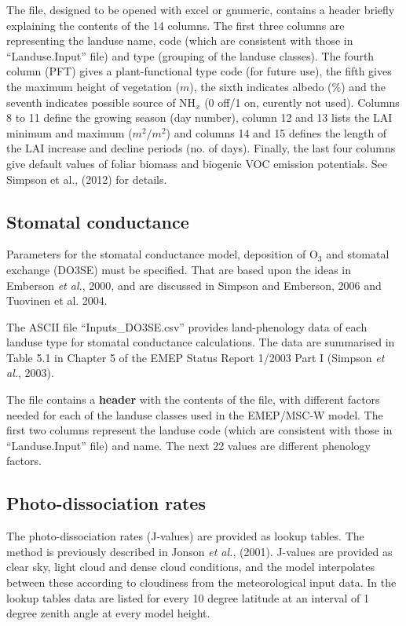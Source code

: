 \documentclass[a4paper,12pt]{report}
\newcommand{\NEW}[1]{{\color{blue}{#1}}}
\begin{document}
The file, designed to be opened with excel or gnumeric,
contains a header briefly explaining the contents of the 
14 columns. 
The first three columns are representing the landuse name, code (which
are consistent with those in ``Landuse.Input'' file) and
type (grouping of the landuse classes). The fourth column 
(PFT) gives a plant-functional type code (for future use),
 the fifth gives
the maximum height of vegetation ($m$), the sixth indicates albedo (\%) and
the seventh indicates possible source of NH$_{x}$ (0 off/1 on,
curently not used). Columns 8 to 11
define the growing season (day number), column 12 and 13 lists the
LAI minimum  and maximum ($m^{2}/m^{2}$) and 
columns 14 and 15
defines the length of the LAI increase and decline periods (no. of days).
Finally, the last four columns give default values of 
foliar biomass and biogenic VOC emission potentials. See Simpson
et al., (2012) for details.


\subsection{Stomatal conductance}
Parameters for the stomatal conductance model, deposition of O$_{3}$ and
stomatal exchange (DO3SE) must be specified. That are based upon the ideas in
Emberson {\sl et al.}, 2000, and are discussed in Simpson and Emberson,
2006 and Tuovinen et al. 2004.

The  ASCII file ``Inputs\_DO3SE.csv'' provides land-phenology data
of each landuse type for stomatal conductance calculations. The 
data are summarised in Table 5.1 in Chapter 5 of the EMEP 
Status Report 1/2003 Part I (Simpson {\sl et al.}, 2003).

The file contains a {\bf header} with the contents of the file,
with different factors needed for each of the landuse classes used
in the EMEP/MSC-W model. The first two columns represent the
landuse code (which are consistent with those in ``Landuse.Input'' file)
and name. The next 22 values are different phenology factors.


\subsection{Photo-dissociation rates}
The photo-dissociation rates (J-values) are provided as lookup
tables. The method is previously described in Jonson {\sl et
al.}, (2001). J-values are provided as clear sky, light cloud and dense
cloud conditions, and the model interpolates between these according
to cloudiness from the meteorological input data. In the lookup tables
data are listed for every 10 degree latitude at an interval of 1
degree zenith angle at every model height.
\end{document}

